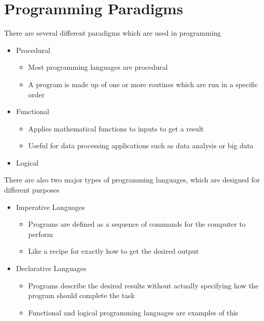 \section*{Programming Paradigms}

There are several different paradigms which are used in programming
\begin{itemize}
  \item Procedural
  \begin{itemize}
    \item Most programming languages are procedural
    \item A program is made up of one or more routines which are run in a specific order
  \end{itemize}
  \item Functional
  \begin{itemize}
    \item Applies mathematical functions to inputs to get a result
    \item Useful for data processing applications such as data analysis or big data
  \end{itemize}
  \item Logical
\end{itemize}

There are also two major types of programming languages, which are designed for different purposes
\begin{itemize}
  \item Imperative Languages
  \begin{itemize}
    \item Programs are defined as a sequence of commands for the computer to perform
    \item Like a recipe for exactly how to get the desired output
  \end{itemize}
  \item Declarative Languages
  \begin{itemize}
    \item Programs describe the desired results without actually specifying how the program should complete the task
    \item Functional and logical programming languages are examples of this
  \end{itemize}
\end{itemize}